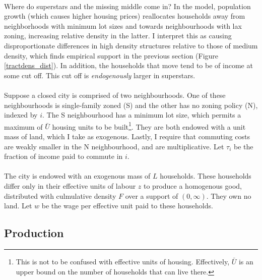 \documentclass[]{article}
\theoremstyle{plain}
\begin{document}
\paragraph*{}
Where do superstars and the missing middle come in? In the model, population growth (which causes higher housing prices) reallocates households away from neighborhoods with minimum lot sizes and towards neighbourhoods with lax zoning, increasing relative density in the latter. I interpret this as causing disproportionate differences in high density structures relative to those of medium density, which finds empirical support in the previous section (Figure \ref{tractdens_dist}). In addition, the households that move tend to be of income at some cut off. This cut off is \textit{endogenously} larger in superstars.  
\paragraph*{}
Suppose a closed city is comprised of two neighbourhoods. One of these neighbourhoods is single-family zoned (S) and the other has no zoning policy (N), indexed by $i$. The S neighbourhood has a minimum lot size, which permits a maximum of $\bar{U}$ housing units to be built\footnote{This is not to be confused with effective units of housing. Effectively, $\bar{U}$ is an upper bound on the number of households that can live there.}. They are both endowed with a unit mass of land, which I take as exogenous. Lastly, I require that commuting costs are weakly smaller in the N neighbourhood, and are multiplicative. Let $\tau_{i}$ be the fraction of income paid to commute in $i$.
\paragraph*{}
The city is endowed with an exogenous mass of $L$ households.
 These households differ only in their effective units of labour $z$ to produce a homogenous good, distributed with culmulative density $F$ over a support of $(0, \infty)$. They own no land. Let $w$ be the wage per effective unit paid to these households. 
\subsection{Production}
\end{document}
